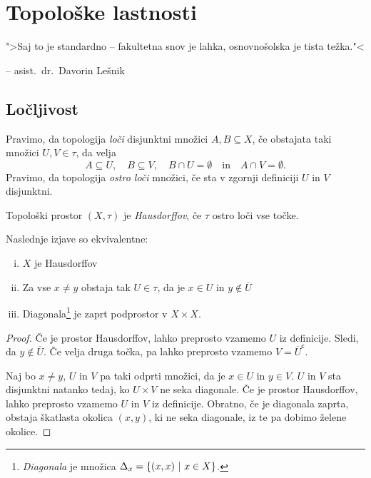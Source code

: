 \section{Topološke lastnosti}

\epigraph{">Saj to je standardno -- fakultetna snov je lahka,
osnovnošolska je tista težka."<}{-- asist.~dr.~Davorin Lešnik}

\subsection{Ločljivost}


\begin{definicija}
Pravimo, da topologija \emph{loči} disjunktni množici
$A, B \subseteq X$, če obstajata taki množici $U, V \in \tau$, da
velja
\[
A \subseteq U,\quad B \subseteq V,\quad B \cap U = \emptyset
\quad \text{in} \quad
A \cap V = \emptyset.
\]
Pravimo, da topologija \emph{ostro loči} množici, če sta v zgornji
definiciji $U$ in $V$ disjunktni.
\end{definicija}

\begin{definicija}
Topološki prostor $(X, \tau)$ je
\emph{Hausdorffov}, če
$\tau$ ostro loči vse točke.
\end{definicija}

\begin{trditev}
Naslednje izjave so ekvivalentne:

\begin{enumerate}[i)]
\item $X$ je Hausdorffov
\item Za vse $x \ne y$ obstaja tak $U \in \tau$, da je $x \in U$ in
$y \not \in \overline{U}$
\item Diagonala\footnote{\emph{Diagonala} je množica
$\Delta_x = \left\{(x,x)~\middle\vert~x \in X\right\}$.} je zaprt podprostor v
$X \times X$.
\end{enumerate}
\end{trditev}

\begin{proof}
Če je prostor Hausdorffov, lahko preprosto vzamemo $U$ iz
definicije. Sledi, da $y \not \in \overline{U}$. Če velja druga
točka, pa lahko preprosto vzamemo $V = \overline{U}^{\mathsf{c}}$.

Naj bo $x \ne y$, $U$ in $V$ pa taki odprti množici, da je
$x \in U$ in $y \in V$. $U$ in $V$ sta disjunktni natanko tedaj, ko
$U \times V$ ne seka diagonale. Če je prostor Hausdorffov, lahko
preprosto vzamemo $U$ in $V$ iz definicije. Obratno, če je
diagonala zaprta, obstaja škatlasta okolica $(x,y)$, ki ne seka
diagonale, iz te pa dobimo želene okolice.
\end{proof}

